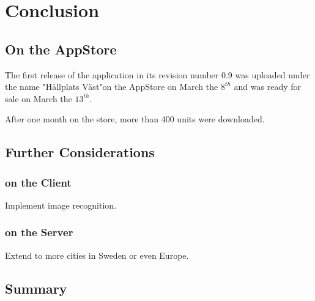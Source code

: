 \chapter{Conclusion}
\label{cha:conclusion}

\section{On the AppStore}

The first release of the application in its revision number 0.9 was uploaded under the name "Hållplats Väst"on the AppStore on March the $8^{th}$ and was ready for sale on March the $13^{th}$.

After one month on the store, more than 400 units were downloaded.

\section{Further Considerations}
\subsection{on the Client}

Implement image recognition.

\subsection{on the Server}

Extend to more cities in Sweden or even Europe.

\section{Summary}
